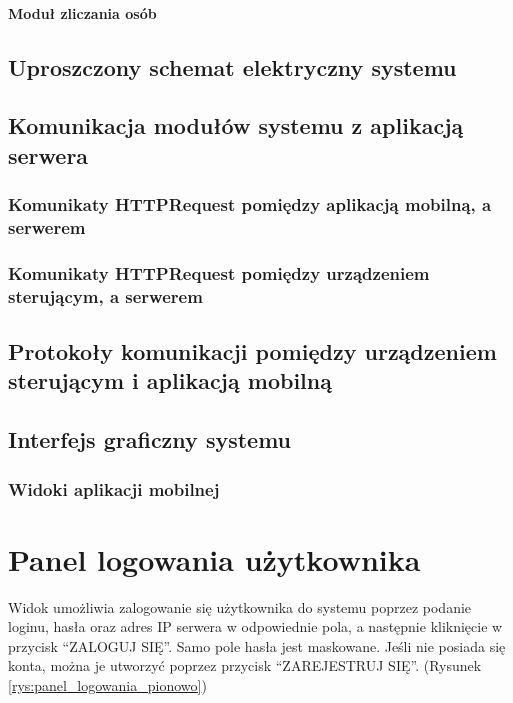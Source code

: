 		\paragraph{Moduł zliczania osób}

\newpage		
\subsection{Uproszczony schemat elektryczny systemu}

\newpage
\subsection{Komunikacja modułów systemu z aplikacją  serwera}

	\subsubsection{Komunikaty HTTPRequest pomiędzy aplikacją mobilną, \newline a serwerem}
	\subsubsection{Komunikaty HTTPRequest pomiędzy urządzeniem sterującym, a serwerem}
	
\newpage
\subsection{Protokoły komunikacji pomiędzy urządzeniem \newline sterującym i aplikacją mobilną}

\newpage
\subsection{Interfejs graficzny systemu}

	\subsubsection{Widoki aplikacji mobilnej}
		\section*{Panel logowania użytkownika}
	Widok umożliwia zalogowanie się użytkownika do systemu poprzez podanie loginu, hasła oraz adres IP serwera w odpowiednie pola, a następnie kliknięcie w przycisk “ZALOGUJ SIĘ”. Samo pole hasła jest maskowane. Jeśli nie posiada się konta, można je utworzyć poprzez przycisk “ZAREJESTRUJ SIĘ”. (Rysunek \ref{rys:panel_logowania_pionowo})
	
